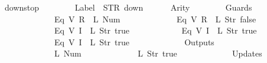\begin{isabellebody}
{\isachardoublequoteopen}down{}{}stop\ {\isasymequiv}\ {\isasymlparr}\isanewline
\ \ \ \ \ \ Label\ {\isacharequal}\ STR\ {\isacharprime}{\isacharprime}down{\isacharprime}{\isacharprime}{\isacharcomma}\isanewline
\ \ \ \ \ \ Arity\ {\isacharequal}\ {}{\isacharcomma}\isanewline
\ \ \ \ \ \ Guards\ {\isacharequal}\ {\isacharbrackleft}\isanewline
\ \ \ \ \ \ \ \ \ \ \ \ {\isacharparenleft}Eq\ {\isacharparenleft}V\ {\isacharparenleft}R\ {}{\isacharparenright}{\isacharparenright}\ {\isacharparenleft}L\ {\isacharparenleft}Num\ {}{\isacharparenright}{\isacharparenright}{\isacharparenright}{\isacharcomma}\isanewline
\ \ \ \ \ \ \ \ \ \ \ \ {\isacharparenleft}Eq\ {\isacharparenleft}V\ {\isacharparenleft}R\ {}{\isacharparenright}{\isacharparenright}\ {\isacharparenleft}L\ {\isacharparenleft}Str\ {\isacharprime}{\isacharprime}false{\isacharprime}{\isacharprime}{\isacharparenright}{\isacharparenright}{\isacharparenright}{\isacharcomma}\isanewline
\ \ \ \ \ \ \ \ \ \ \ \ {\isacharparenleft}Eq\ {\isacharparenleft}V\ {\isacharparenleft}I\ {}{\isacharparenright}{\isacharparenright}\ {\isacharparenleft}L\ {\isacharparenleft}Str\ {\isacharprime}{\isacharprime}true{\isacharprime}{\isacharprime}{\isacharparenright}{\isacharparenright}{\isacharparenright}{\isacharcomma}\isanewline
\ \ \ \ \ \ \ \ \ \ \ \ {\isacharparenleft}Eq\ {\isacharparenleft}V\ {\isacharparenleft}I\ {}{\isacharparenright}{\isacharparenright}\ {\isacharparenleft}L\ {\isacharparenleft}Str\ {\isacharprime}{\isacharprime}true{\isacharprime}{\isacharprime}{\isacharparenright}{\isacharparenright}{\isacharparenright}{\isacharcomma}\isanewline
\ \ \ \ \ \ \ \ \ \ \ \ {\isacharparenleft}Eq\ {\isacharparenleft}V\ {\isacharparenleft}I\ {}{\isacharparenright}{\isacharparenright}\ {\isacharparenleft}L\ {\isacharparenleft}Str\ {\isacharprime}{\isacharprime}true{\isacharprime}{\isacharprime}{\isacharparenright}{\isacharparenright}{\isacharparenright}\isanewline
\ \ \ \ \ \ {\isacharbrackright}{\isacharcomma}\isanewline
\ \ \ \ \ \ Outputs\ {\isacharequal}\ {\isacharbrackleft}\isanewline
\ \ \ \ \ \ \ \ \ \ \ \ {\isacharparenleft}L\ {\isacharparenleft}Num\ {}{\isacharparenright}{\isacharparenright}{\isacharcomma}\isanewline
\ \ \ \ \ \ \ \ \ \ \ \ {\isacharparenleft}L\ {\isacharparenleft}Str\ {\isacharprime}{\isacharprime}true{\isacharprime}{\isacharprime}{\isacharparenright}{\isacharparenright}\isanewline
\ \ \ \ \ \ {\isacharbrackright}{\isacharcomma}\isanewline
\ \ \ \ \ \ Updates\ {\isacharequal}\ {\isacharbrackleft}\isanewline

\end{isabellebody}
